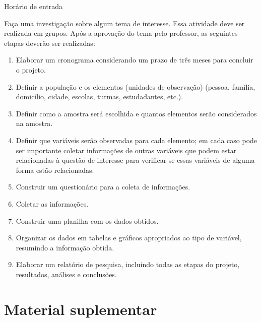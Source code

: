 {\begin{example}{Horário de entrada}
\begin{enumerate}
\end{enumerate}
\end{example}


\begin{project}
\label{est1-projeto-1}

Faça uma investigação sobre algum tema de interesse. Essa atividade deve ser realizada em grupos.  Após a aprovação do tema pelo professor, as seguintes etapas deverão ser realizadas:
\begin{enumerate}
\item {} 
Elaborar um cronograma considerando um prazo de três meses para concluir o projeto.

\item {} 
Definir a população e os elementos (unidades de observação) (pessoa, família, domicílio, cidade, escolas, turmas, estudadantes, etc.).

\item {} 
Definir como a amostra será escolhida e quantos elementos serão considerados na amostra.

\item {} 
Definir que variáveis serão observadas para cada elemento; em cada caso pode ser importante coletar informações de outras variáveis que podem estar relacionadas à questão de interesse para verificar se essas variáveis de alguma forma estão relacionadas.

\item {} 
Construir um questionário para a coleta de informações.

\item {} 
Coletar as informações.

\item {} 
Construir uma planilha com os dados obtidos.

\item {} 
Organizar os dados em tabelas e gráficos apropriados ao tipo de variável, resumindo a informação obtida.

\item {} 
Elaborar um relatório de pesquisa, incluindo todas as etapas do projeto, resultados, análises e conclusões.

\end{enumerate}
\end{project}

\section{Material suplementar}
\label{est1-suplementar-1}

}
